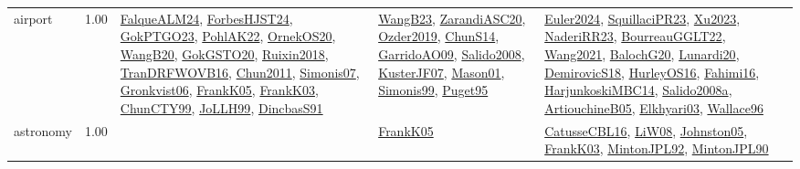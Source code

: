 {\begin{longtable}{p{3cm}r>{\raggedright\arraybackslash}p{6cm}>{\raggedright\arraybackslash}p{6cm}>{\raggedright\arraybackslash}p{8cm}}
\index{airport}\index{ApplicationAreas!airport}airport &  1.00 & \hyperref[detail:FalqueALM24]{FalqueALM24}, \hyperref[detail:ForbesHJST24]{ForbesHJST24}, \hyperref[detail:GokPTGO23]{GokPTGO23}, \hyperref[detail:PohlAK22]{PohlAK22}, \hyperref[detail:OrnekOS20]{OrnekOS20}, \hyperref[detail:WangB20]{WangB20}, \hyperref[detail:GokGSTO20]{GokGSTO20}, \hyperref[detail:Ruixin2018]{Ruixin2018}, \hyperref[detail:TranDRFWOVB16]{TranDRFWOVB16}, \hyperref[detail:Chun2011]{Chun2011}, \hyperref[detail:Simonis07]{Simonis07}, \hyperref[detail:Gronkvist06]{Gronkvist06}, \hyperref[detail:FrankK05]{FrankK05}, \hyperref[detail:FrankK03]{FrankK03}, \hyperref[detail:ChunCTY99]{ChunCTY99}, \hyperref[detail:JoLLH99]{JoLLH99}, \hyperref[detail:DincbasS91]{DincbasS91} & \hyperref[detail:WangB23]{WangB23}, \hyperref[detail:ZarandiASC20]{ZarandiASC20}, \hyperref[detail:Ozder2019]{Ozder2019}, \hyperref[detail:ChunS14]{ChunS14}, \hyperref[detail:GarridoAO09]{GarridoAO09}, \hyperref[detail:Salido2008]{Salido2008}, \hyperref[detail:KusterJF07]{KusterJF07}, \hyperref[detail:Mason01]{Mason01}, \hyperref[detail:Simonis99]{Simonis99}, \hyperref[detail:Puget95]{Puget95} & \hyperref[detail:Euler2024]{Euler2024}, \hyperref[detail:SquillaciPR23]{SquillaciPR23}, \hyperref[detail:Xu2023]{Xu2023}, \hyperref[detail:NaderiRR23]{NaderiRR23}, \hyperref[detail:BourreauGGLT22]{BourreauGGLT22}, \hyperref[detail:Wang2021]{Wang2021}, \hyperref[detail:BalochG20]{BalochG20}, \hyperref[detail:Lunardi20]{Lunardi20}, \hyperref[detail:DemirovicS18]{DemirovicS18}, \hyperref[detail:HurleyOS16]{HurleyOS16}, \hyperref[detail:Fahimi16]{Fahimi16}, \hyperref[detail:HarjunkoskiMBC14]{HarjunkoskiMBC14}, \hyperref[detail:Salido2008a]{Salido2008a}, \hyperref[detail:ArtiouchineB05]{ArtiouchineB05}, \hyperref[detail:Elkhyari03]{Elkhyari03}, \hyperref[detail:Wallace96]{Wallace96}\\
\index{astronomy}\index{ApplicationAreas!astronomy}astronomy &  1.00 &  & \hyperref[detail:FrankK05]{FrankK05} & \hyperref[detail:CatusseCBL16]{CatusseCBL16}, \hyperref[detail:LiW08]{LiW08}, \hyperref[detail:Johnston05]{Johnston05}, \hyperref[detail:FrankK03]{FrankK03}, \hyperref[detail:MintonJPL92]{MintonJPL92}, \hyperref[detail:MintonJPL90]{MintonJPL90}\\

\end{longtable}}
